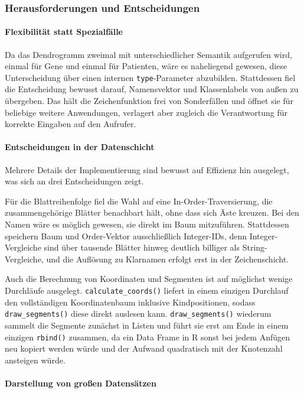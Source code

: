 \documentclass[12pt]{article}
\newcommand{\code}[1]{\texttt{#1}}
\begin{document}
\subsubsection{Herausforderungen und Entscheidungen}

\paragraph{Flexibilität statt Spezialfälle}

Da das Dendrogramm zweimal mit unterschiedlicher Semantik aufgerufen wird, einmal 
für Gene und einmal für Patienten, wäre es naheliegend gewesen, diese Unterscheidung 
über einen internen \code{type}-Parameter abzubilden. Stattdessen fiel die 
Entscheidung bewusst darauf, Namensvektor und Klassenlabels von außen zu übergeben. 
Das hält die Zeichenfunktion frei von Sonderfällen und öffnet sie für beliebige 
weitere Anwendungen, verlagert aber zugleich die Verantwortung für korrekte 
Eingaben auf den Aufrufer.

\paragraph{Entscheidungen in der Datenschicht}

Mehrere Details der Implementierung sind bewusst auf Effizienz hin ausgelegt, 
was sich an drei Entscheidungen zeigt.

Für die Blattreihenfolge fiel die Wahl auf eine In-Order-Traversierung, die 
zusammengehörige Blätter benachbart hält, ohne dass sich Äste kreuzen. Bei den 
Namen wäre es möglich gewesen, sie direkt im Baum mitzuführen. Stattdessen 
speichern Baum und Order-Vektor ausschließlich Integer-IDs, denn Integer-Vergleiche 
sind über tausende Blätter hinweg deutlich billiger als String-Vergleiche, und die 
Auflösung zu Klarnamen erfolgt erst in der Zeichenschicht.

Auch die Berechnung von Koordinaten und Segmenten ist auf möglichst wenige 
Durchläufe ausgelegt. \code{calculate\_coords()} liefert in einem einzigen 
Durchlauf den vollständigen Koordinatenbaum inklusive Kindpositionen, sodass 
\code{draw\_segments()} diese direkt auslesen kann. \code{draw\_segments()} 
wiederum sammelt die Segmente zunächst in Listen und führt sie erst am Ende in 
einem einzigen \code{rbind()} zusammen, da ein Data Frame in R sonst bei jedem 
Anfügen neu kopiert werden würde und der Aufwand quadratisch mit der Knotenzahl ansteigen würde.

\paragraph{Darstellung von großen Datensätzen}
\end{document}
